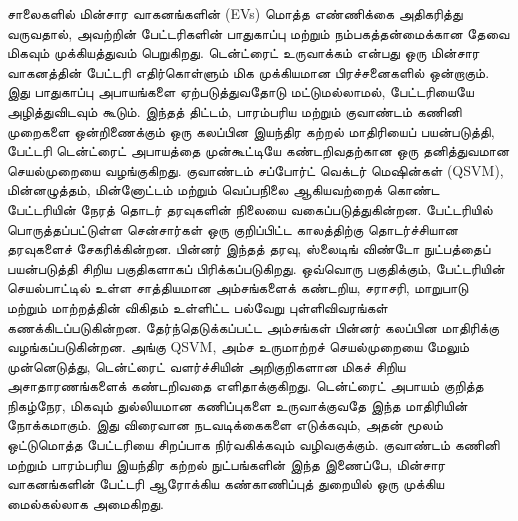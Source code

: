 {\tamilfont
சாலைகளில் மின்சார வாகனங்களின் (EVs) மொத்த எண்ணிக்கை அதிகரித்து வருவதால், அவற்றின் பேட்டரிகளின் பாதுகாப்பு மற்றும் நம்பகத்தன்மைக்கான தேவை மிகவும் முக்கியத்துவம் பெறுகிறது. டென்ட்ரைட் உருவாக்கம் என்பது ஒரு மின்சார வாகனத்தின் பேட்டரி எதிர்கொள்ளும் மிக முக்கியமான பிரச்சனைகளில் ஒன்றாகும். இது பாதுகாப்பு அபாயங்களை ஏற்படுத்துவதோடு மட்டுமல்லாமல், பேட்டரியையே அழித்துவிடவும் கூடும். இந்தத் திட்டம், பாரம்பரிய மற்றும் குவாண்டம் கணினி முறைகளை ஒன்றிணைக்கும் ஒரு கலப்பின இயந்திர கற்றல் மாதிரியைப் பயன்படுத்தி, பேட்டரி டென்ட்ரைட் அபாயத்தை முன்கூட்டியே கண்டறிவதற்கான ஒரு தனித்துவமான செயல்முறையை வழங்குகிறது. குவாண்டம் சப்போர்ட் வெக்டர் மெஷின்கள் (QSVM), மின்னழுத்தம், மின்னோட்டம் மற்றும் வெப்பநிலை ஆகியவற்றைக் கொண்ட பேட்டரியின் நேரத் தொடர் தரவுகளின் நிலையை வகைப்படுத்துகின்றன. பேட்டரியில் பொருத்தப்பட்டுள்ள சென்சார்கள் ஒரு குறிப்பிட்ட காலத்திற்கு தொடர்ச்சியான தரவுகளைச் சேகரிக்கின்றன. பின்னர் இந்தத் தரவு, ஸ்லைடிங் விண்டோ நுட்பத்தைப் பயன்படுத்தி சிறிய பகுதிகளாகப் பிரிக்கப்படுகிறது. ஒவ்வொரு பகுதிக்கும், பேட்டரியின் செயல்பாட்டில் உள்ள சாத்தியமான அம்சங்களைக் கண்டறிய, சராசரி, மாறுபாடு மற்றும் மாற்றத்தின் விகிதம் உள்ளிட்ட பல்வேறு புள்ளிவிவரங்கள் கணக்கிடப்படுகின்றன. தேர்ந்தெடுக்கப்பட்ட அம்சங்கள் பின்னர் கலப்பின மாதிரிக்கு வழங்கப்படுகின்றன. அங்கு QSVM, அம்ச உருமாற்றச் செயல்முறையை மேலும் முன்னெடுத்து, டென்ட்ரைட் வளர்ச்சியின் அறிகுறிகளான மிகச் சிறிய அசாதாரணங்களைக் கண்டறிவதை எளிதாக்குகிறது. டென்ட்ரைட் அபாயம் குறித்த நிகழ்நேர, மிகவும் துல்லியமான கணிப்புகளை உருவாக்குவதே இந்த மாதிரியின் நோக்கமாகும். இது விரைவான நடவடிக்கைகளை எடுக்கவும், அதன் மூலம் ஒட்டுமொத்த பேட்டரியை சிறப்பாக நிர்வகிக்கவும் வழிவகுக்கும். குவாண்டம் கணினி மற்றும் பாரம்பரிய இயந்திர கற்றல் நுட்பங்களின் இந்த இணைப்பே, மின்சார வாகனங்களின் பேட்டரி ஆரோக்கிய கண்காணிப்புத் துறையில் ஒரு முக்கிய மைல்கல்லாக அமைகிறது.
}